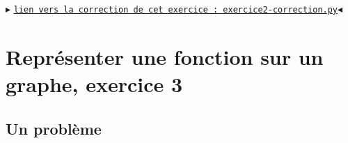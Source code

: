 \documentclass[11pt]{article}
\begin{document}
\bigskip

\smallskip


\begin{center}
$\blacktriangleright$ \href{https://github.com/formationPythonPC-Juin/corrections-formation/blob/master/exercice2-correction.py}{\underline{\texttt{lien vers la correction de cet exercice : exercice2-correction.py}}}$\blacktriangleleft$                                                                                                                                                                    \end{center}

























\section{Représenter une fonction sur un graphe, exercice 3}

\subsection{Un problème}
\end{document}
